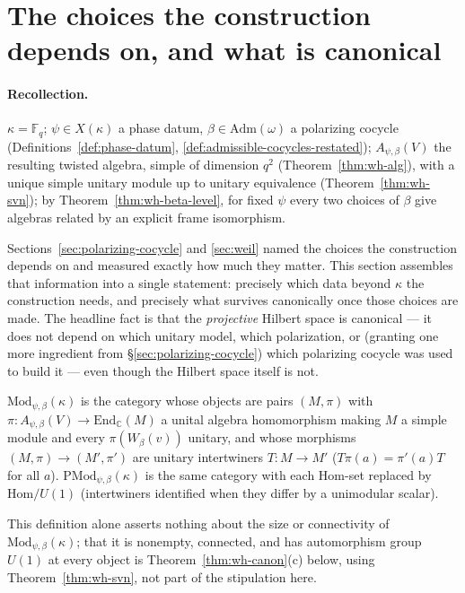 \section{The choices the construction depends on, and what is canonical}
\label{sec:canonicity}

\paragraph{Recollection.} $\kappa=\mathbb{F}_q$; $\psi\in X(\kappa)$ a phase
datum, $\beta\in\mathrm{Adm}(\omega)$ a polarizing cocycle
(Definitions~\ref{def:phase-datum}, \ref{def:admissible-cocycles-restated});
$A_{\psi,\beta}(V)$ the resulting twisted algebra, simple of dimension $q^2$
(Theorem~\ref{thm:wh-alg}), with a unique simple unitary module up to
unitary equivalence (Theorem~\ref{thm:wh-svn}); by
Theorem~\ref{thm:wh-beta-level}, for fixed $\psi$ every two choices of
$\beta$ give algebras related by an explicit frame isomorphism.

Sections~\ref{sec:polarizing-cocycle} and \ref{sec:weil} named the choices
the construction depends on and measured exactly how much they matter. This
section assembles that information into a single statement: precisely which
data beyond $\kappa$ the construction needs, and precisely what survives
canonically once those choices are made. The headline fact is that the
\emph{projective} Hilbert space is canonical — it does not depend on which
unitary model, which polarization, or (granting one more ingredient from
\S\ref{sec:polarizing-cocycle}) which polarizing cocycle was used to build
it — even though the Hilbert space itself is not.

\begin{definition}
\label{def:model-groupoid}
$\mathrm{Mod}_{\psi,\beta}(\kappa)$ is the category whose objects are pairs
$(M,\pi)$ with $\pi : A_{\psi,\beta}(V) \to \mathrm{End}_{\mathbb{C}}(M)$ a
unital algebra homomorphism making $M$ a simple module and every
$\pi(W_\beta(v))$ unitary, and whose morphisms $(M,\pi)\to(M',\pi')$ are
unitary intertwiners $T:M\to M'$ ($T\pi(a)=\pi'(a)T$ for all $a$).
$\mathrm{PMod}_{\psi,\beta}(\kappa)$ is the same category with each
$\mathrm{Hom}$-set replaced by $\mathrm{Hom}/U(1)$ (intertwiners identified
when they differ by a unimodular scalar).
\end{definition}

\begin{scope}
This definition alone asserts nothing about the size or connectivity of
$\mathrm{Mod}_{\psi,\beta}(\kappa)$; that it is nonempty, connected, and has
automorphism group $U(1)$ at every object is
Theorem~\ref{thm:wh-canon}(c) below, using Theorem~\ref{thm:wh-svn}, not
part of the stipulation here.
\end{scope}

